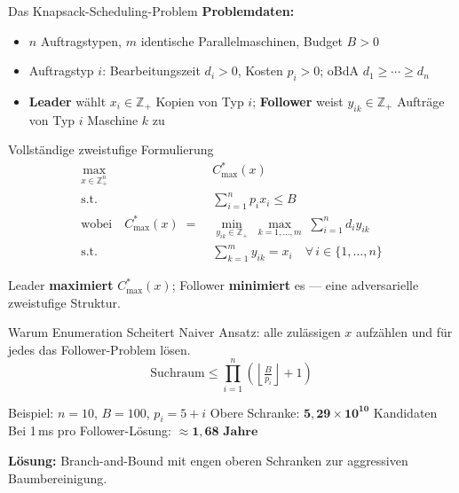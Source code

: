 \documentclass[fleqn,11pt,aspectratio=43]{beamer}
\newcommand{\Copt}{C_{\max}^{*}}
\begin{document}
\begin{frame}[shrink=36]{Das Knapsack-Scheduling-Problem}
  \textbf{Problemdaten:}
  \begin{itemize}
    \item $n$ Auftragstypen, $m$ identische Parallelmaschinen, Budget $B>0$
    \item Auftragstyp $i$: Bearbeitungszeit $d_i>0$, Kosten $p_i>0$; oBdA $d_1\geq\cdots\geq d_n$
    \item \textbf{Leader} wählt $x_i\in\mathbb{Z}_+$ Kopien von Typ $i$;
          \textbf{Follower} weist $y_{ik}\in\mathbb{Z}_+$ Aufträge von Typ $i$ Maschine $k$ zu
  \end{itemize}
  \begin{block}{Vollständige zweistufige Formulierung}
    \vspace{-0.2em}
    \begin{align*}
      \max_{x\in\mathbb{Z}_+^n}\quad & \Copt(x)\\
      \text{s.t.}\quad & \textstyle\sum_{i=1}^{n}p_ix_i\leq B\\[0.4em]
      \text{wobei}\quad\Copt(x)\;=\;& \min_{y_{ik}\in\mathbb{Z}_+}\;\max_{k=1,\ldots,m}\;\sum_{i=1}^{n}d_i y_{ik}\\
      \text{s.t.}\quad & \textstyle\sum_{k=1}^{m}y_{ik}=x_i\quad\forall\,i \in\{1,\ldots,n\}
    \end{align*}
    \vspace{-0.3em}
  \end{block}
  \smallskip
  Leader \textbf{maximiert} $\Copt(x)$; Follower \textbf{minimiert} es — eine adversarielle zweistufige Struktur.
\end{frame}

\begin{frame}{Warum Enumeration Scheitert}
  Naiver Ansatz: alle zulässigen $x$ aufzählen und für jedes das Follower-Problem lösen.
  \[
    \text{Suchraum} \leq \prod_{i=1}^{n}\!\left(\!\left\lfloor\tfrac{B}{p_i}\right\rfloor+1\right)
  \]
  \begin{block}{Beispiel: $n=10$, $B=100$, $p_i=5{+}i$}
    Obere Schranke: $\mathbf{5{,}29\times 10^{10}}$ Kandidaten\\[0.2em]
    Bei 1\,ms pro Follower-Lösung: $\approx\mathbf{1{,}68\text{ Jahre}}$
  \end{block}
  \bigskip
  \textbf{Lösung:} Branch-and-Bound mit engen oberen Schranken zur aggressiven Baumbereinigung.
\end{frame}
\end{document}
